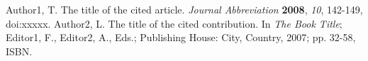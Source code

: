\documentclass[journal,article,submit,moreauthors,pdftex,10pt,a4paper]{Definitions/mdpi}
\theoremstyle{plain}
\theoremstyle{definition}
\theoremstyle{remark}
\begin{document}
\begin{thebibliography}{999}
Author1, T. The title of the cited article. {\em Journal Abbreviation} {\bf 2008}, {\em 10}, 142-149, doi:xxxxx.
Author2, L. The title of the cited contribution. In {\em The Book Title}; Editor1, F., Editor2, A., Eds.; Publishing House: City, Country, 2007; pp. 32-58, ISBN.
\end{thebibliography}


%



\end{document}
